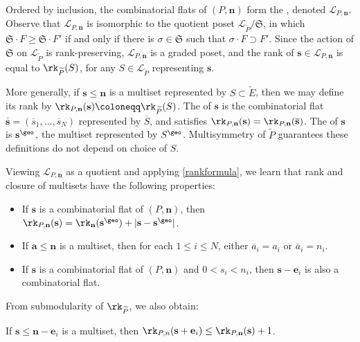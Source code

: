 Ordered by inclusion, the combinatorial flats of $(P, \mathbf n)$ form the , denoted $\mathcal L_{P, \mathbf n}$.
Observe that $\mathcal L_{P, \mathbf n}$ is isomorphic to the quotient poset $\mathcal L_{\widetilde P} / \mathfrak S$, in which $\mathfrak S \cdot F \geq \mathfrak S \cdot F'$ if and only if there is $\sigma \in \mathfrak S$ such that $\sigma \cdot F \supset F'$.
Since the action of $\mathfrak S$ on $\mathcal L_{\widetilde P}$ is rank-preserving, $\mathcal L_{P, \mathbf n}$ is a graded poset,
and the rank of $\mathbf s \in \mathcal L_{P, \mathbf n}$ is equal to $\rk_{\widetilde P}(S)$, for any $S \in \mathcal L_{\widetilde P}$ representing $\mathbf s$.

More generally, if $\mathbf s \leq \mathbf n$ is a multiset represented by $S \subset \widetilde E$, then we may define its rank by $\rk_{P, \mathbf n}(\mathbf s) \coloneqq \rk_{\widetilde P}(S)$.
The  of $\mathbf s$ is the combinatorial flat $\overline{\mathbf s} = (\overline s_1, \ldots, \overline s_N)$ represented by $\overline S$, and satisfies $\rk_{P, \mathbf n}(\mathbf s) = \rk_{P, \mathbf n}(\overline{\mathbf s})$. The  of $\mathbf s$ is $\mathbf s^\geo$, the multiset represented by $S^\geo$.
Multisymmetry of $\widetilde P$ guarantees these definitions do not depend on choice of $S$.

Viewing $\mathcal L_{P, \mathbf n}$ as a quotient and applying \cref{rankformula}, we learn that rank and closure of multisets have the following properties:
\begin{lemm}\label{combrankformula}\hfill
  \begin{itemize}
  \item If $\mathbf s$ is a combinatorial flat of $(P, \mathbf n)$, then $\rk_{P,\mathbf n}(\mathbf s) = \rk_{\mathbf n}(\mathbf s^\geo) + |\mathbf s -\mathbf s^\geo|$.
  \item If $\mathbf a \leq \mathbf n$ is a multiset, then for each $1 \leq i \leq N$, either $\overline{a}_i = a_i$ or $\overline{a}_i = n_i$.
  \item If $\mathbf s$ is a combinatorial flat of $(P, \mathbf n)$ and $0 < s_i < n_i$, then $\mathbf s - \mathbf e_i$ is also a combinatorial flat.
  \end{itemize}
\end{lemm}
From submodularity of $\rk_{\widetilde P}$, we also obtain:
\begin{lemm}\label{stupidbound}
  If $\mathbf s \leq \mathbf n - \mathbf e_i$ is a multiset, then 
  $\rk_{P, n}(\mathbf s + \mathbf e_i) \leq \rk_{P, \mathbf n}(\mathbf s) + 1$.
\end{lemm}

